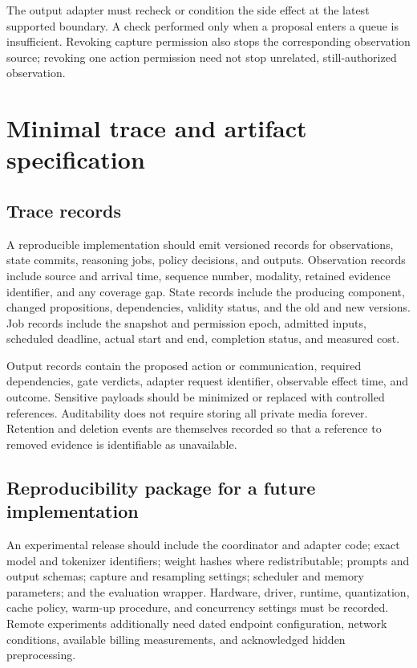 \documentclass[11pt,letterpaper]{article}
\begin{document}
\noindent The output adapter must recheck or condition the side effect at the latest supported boundary. A check performed only when a proposal enters a queue is insufficient. Revoking capture permission also stops the corresponding observation source; revoking one action permission need not stop unrelated, still-authorized observation.

\section{Minimal trace and artifact specification}
\subsection{Trace records}
A reproducible implementation should emit versioned records for observations, state commits, reasoning jobs, policy decisions, and outputs. Observation records include source and arrival time, sequence number, modality, retained evidence identifier, and any coverage gap. State records include the producing component, changed propositions, dependencies, validity status, and the old and new versions. Job records include the snapshot and permission epoch, admitted inputs, scheduled deadline, actual start and end, completion status, and measured cost.

Output records contain the proposed action or communication, required dependencies, gate verdicts, adapter request identifier, observable effect time, and outcome. Sensitive payloads should be minimized or replaced with controlled references. Auditability does not require storing all private media forever. Retention and deletion events are themselves recorded so that a reference to removed evidence is identifiable as unavailable.

\subsection{Reproducibility package for a future implementation}
An experimental release should include the coordinator and adapter code; exact model and tokenizer identifiers; weight hashes where redistributable; prompts and output schemas; capture and resampling settings; scheduler and memory parameters; and the evaluation wrapper. Hardware, driver, runtime, quantization, cache policy, warm-up procedure, and concurrency settings must be recorded. Remote experiments additionally need dated endpoint configuration, network conditions, available billing measurements, and acknowledged hidden preprocessing.
\end{document}
